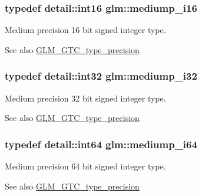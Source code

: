 \subsubsection[{mediump\+\_\+i16}]{\setlength{\rightskip}{0pt plus 5cm}typedef {\bf detail\+::int16} {\bf glm\+::mediump\+\_\+i16}}\label{group__gtc__type__precision_ga8454fc6a82c7bb787d0ac9663e08f63d}
Medium precision 16 bit signed integer type. \begin{DoxySeeAlso}{See also}
\hyperlink{group__gtc__type__precision}{G\+L\+M\+\_\+\+G\+T\+C\+\_\+type\+\_\+precision} 
\end{DoxySeeAlso}
\hypertarget{group__gtc__type__precision_ga5e00ec824eb55968a6b6496f294d8c07}{}
\subsubsection[{mediump\+\_\+i32}]{\setlength{\rightskip}{0pt plus 5cm}typedef {\bf detail\+::int32} {\bf glm\+::mediump\+\_\+i32}}\label{group__gtc__type__precision_ga5e00ec824eb55968a6b6496f294d8c07}
Medium precision 32 bit signed integer type. \begin{DoxySeeAlso}{See also}
\hyperlink{group__gtc__type__precision}{G\+L\+M\+\_\+\+G\+T\+C\+\_\+type\+\_\+precision} 
\end{DoxySeeAlso}
\hypertarget{group__gtc__type__precision_ga90fedf6c701ffbe00535156715e50787}{}
\subsubsection[{mediump\+\_\+i64}]{\setlength{\rightskip}{0pt plus 5cm}typedef detail\+::int64 {\bf glm\+::mediump\+\_\+i64}}\label{group__gtc__type__precision_ga90fedf6c701ffbe00535156715e50787}
Medium precision 64 bit signed integer type. \begin{DoxySeeAlso}{See also}
\hyperlink{group__gtc__type__precision}{G\+L\+M\+\_\+\+G\+T\+C\+\_\+type\+\_\+precision} 
\end{DoxySeeAlso}
\hypertarget{group__gtc__type__precision_ga28a8b5fd51072680bb55178c17cc7411}{}
